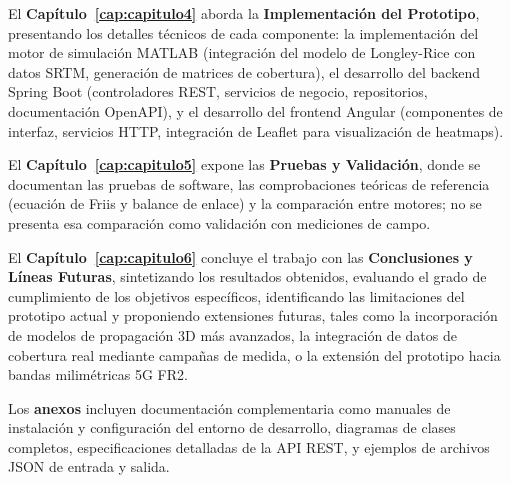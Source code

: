 El \textbf{Capítulo~\ref{cap:capitulo4}} aborda la \textbf{Implementación del Prototipo}, presentando los detalles técnicos de cada componente: la implementación del motor de simulación MATLAB (integración del modelo de Longley-Rice con datos SRTM, generación de matrices de cobertura), el desarrollo del backend Spring Boot (controladores REST, servicios de negocio, repositorios, documentación OpenAPI), y el desarrollo del frontend Angular (componentes de interfaz, servicios HTTP, integración de Leaflet para visualización de heatmaps).

El \textbf{Capítulo~\ref{cap:capitulo5}} expone las \textbf{Pruebas y Validación}, donde se documentan las pruebas de software, las comprobaciones teóricas de referencia (ecuación de Friis y balance de enlace) y la comparación entre motores; no se presenta esa comparación como validación con mediciones de campo.

El \textbf{Capítulo~\ref{cap:capitulo6}} concluye el trabajo con las \textbf{Conclusiones y Líneas Futuras}, sintetizando los resultados obtenidos, evaluando el grado de cumplimiento de los objetivos específicos, identificando las limitaciones del prototipo actual y proponiendo extensiones futuras, tales como la incorporación de modelos de propagación 3D más avanzados, la integración de datos de cobertura real mediante campañas de medida, o la extensión del prototipo hacia bandas milimétricas 5G FR2.

Los \textbf{anexos} incluyen documentación complementaria como manuales de instalación y configuración del entorno de desarrollo, diagramas de clases completos, especificaciones detalladas de la API REST, y ejemplos de archivos JSON de entrada y salida.
